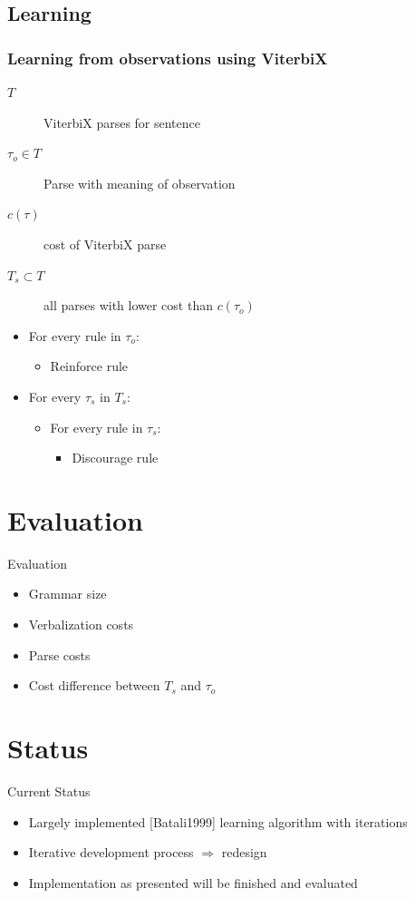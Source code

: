 \documentclass[11pt,a4paper,xcolor=dvipsnames]{beamer}
\begin{document}
\subsection{Learning}
\begin{frame} %
\frametitle{Learning from observations using ViterbiX}
\begin{description}
  \item[$T$] ViterbiX parses for sentence
  \item[$\tau_o \in T$] Parse with meaning of observation
  \item[$c(\tau)$] cost of ViterbiX parse
  \item[$T_s \subset T$] all parses with lower cost than $c(\tau_o)$
\end{description}

\begin{itemize}
\item For every rule in $\tau_o$:
    \begin{itemize}
      \item Reinforce rule
    \end{itemize}
  \item For every $\tau_s$ in $T_s$:
    \begin{itemize}
      \item For every rule in $\tau_s$:
        \begin{itemize}
          \item Discourage rule
        \end{itemize}
    \end{itemize}
\end{itemize}
\end{frame}

\section{Evaluation}
\begin{frame}{Evaluation} %
\begin{itemize}
  \item Grammar size
  \item Verbalization costs
  \item Parse costs
  \item Cost difference between $T_s$ and $\tau_o$
\end{itemize}
\end{frame}

\section{Status} %
\begin{frame}{Current Status}
  \begin{itemize}
    \item Largely implemented [Batali1999] learning algorithm with iterations
    \item Iterative development process $\Rightarrow$ redesign
    \item Implementation as presented will be finished and evaluated
  \end{itemize}
\end{frame}
\end{document}
